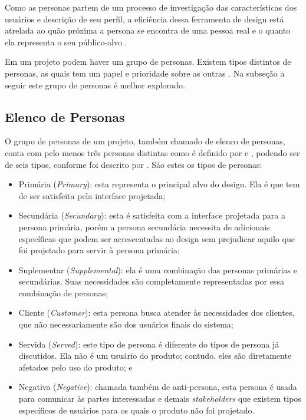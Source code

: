 Como as personas partem de um processo de investigação das características dos usuários e descrição de seu perfil, a eficiência dessa ferramenta de design está atrelada ao quão próxima a persona se encontra de uma pessoa real e o quanto ela representa o seu público-alvo \cite[p. 154]{BarbosaEtAl2021}. 

Em um projeto podem haver um grupo de personas. Existem tipos distintos de personas, as quais tem um papel e prioridade sobre as outras \cite[p. 154]{BarbosaEtAl2021}. Na subseção a seguir este grupo de personas é melhor explorado.

\subsection{Elenco de Personas}

O grupo de personas de um projeto, também chamado de elenco de personas, conta com pelo menos três personas distintas como é definido por  e \citeauthor{usability2020}, podendo ser de seis tipos, conforme foi descrito por . São estes os tipos de personas:

\begin{itemize}
    \item Primária (\textit{Primary}): esta representa o principal alvo do design. Ela é que tem de ser satisfeita pela interface projetada;
    
    \item Secundária (\textit{Secundary}): esta é satisfeita com a interface projetada para a persona primária, porém a persona secundária necessita de adicionais específicas que podem ser acrescentadas ao design sem prejudicar aquilo que foi projetado para servir à persona primária;
    
    \item Suplementar (\textit{Supplemental}): ela é uma combinação das personas primárias e secundárias. Suas necessidades são completamente representadas por essa combinação de personas;
    
    \item Cliente (\textit{Customer}): esta persona busca atender às necessidades dos clientes, que não necessariamente são dos usuários finais do sistema;
    
    \item Servida (\textit{Served}): este tipo de persona é diferente do tipos de persona já discutidos. Ela não é um usuário do produto; contudo, eles são diretamente afetados pelo uso do produto; e
    
    \item Negativa (\textit{Negative}): chamada também de anti-persona, esta persona é usada para comunicar às partes interessadas e demais \textit{stakeholders} que existem tipos específicos de usuários para os quais o produto não foi projetado. 
\end{itemize}

